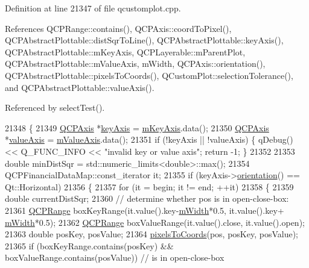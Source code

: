 Definition at line 21347 of file qcustomplot.\+cpp.



References Q\+C\+P\+Range\+::contains(), Q\+C\+P\+Axis\+::coord\+To\+Pixel(), Q\+C\+P\+Abstract\+Plottable\+::dist\+Sqr\+To\+Line(), Q\+C\+P\+Abstract\+Plottable\+::key\+Axis(), Q\+C\+P\+Abstract\+Plottable\+::m\+Key\+Axis, Q\+C\+P\+Layerable\+::m\+Parent\+Plot, Q\+C\+P\+Abstract\+Plottable\+::m\+Value\+Axis, m\+Width, Q\+C\+P\+Axis\+::orientation(), Q\+C\+P\+Abstract\+Plottable\+::pixels\+To\+Coords(), Q\+Custom\+Plot\+::selection\+Tolerance(), and Q\+C\+P\+Abstract\+Plottable\+::value\+Axis().



Referenced by select\+Test().


\begin{DoxyCode}
21348 \{
21349   \hyperlink{class_q_c_p_axis}{QCPAxis} *\hyperlink{class_q_c_p_abstract_plottable_a72c7a09c22963f2c943f07112b311103}{keyAxis} = \hyperlink{class_q_c_p_abstract_plottable_a426f42e254d0f8ce5436a868c61a6827}{mKeyAxis}.data();
21350   \hyperlink{class_q_c_p_axis}{QCPAxis} *\hyperlink{class_q_c_p_abstract_plottable_a3106f9d34d330a6097a8ec5905e5b519}{valueAxis} = \hyperlink{class_q_c_p_abstract_plottable_a2901452ca4aea911a1827717934a4bda}{mValueAxis}.data();
21351   \textcolor{keywordflow}{if} (!keyAxis || !valueAxis) \{ qDebug() << Q\_FUNC\_INFO << \textcolor{stringliteral}{"invalid key or value axis"}; \textcolor{keywordflow}{return} -1; \}
21352 
21353   \textcolor{keywordtype}{double} minDistSqr = std::numeric\_limits<double>::max();
21354   QCPFinancialDataMap::const\_iterator it;
21355   \textcolor{keywordflow}{if} (keyAxis->\hyperlink{class_q_c_p_axis_a57483f2f60145ddc9e63f3af53959265}{orientation}() == Qt::Horizontal)
21356   \{
21357     \textcolor{keywordflow}{for} (it = begin; it != end; ++it)
21358     \{
21359       \textcolor{keywordtype}{double} currentDistSqr;
21360       \textcolor{comment}{// determine whether pos is in open-close-box:}
21361       \hyperlink{class_q_c_p_range}{QCPRange} boxKeyRange(it.value().key-\hyperlink{class_q_c_p_financial_af630e5eb8485146b9c777e63fd1cf993}{mWidth}*0.5, it.value().key+
      \hyperlink{class_q_c_p_financial_af630e5eb8485146b9c777e63fd1cf993}{mWidth}*0.5);
21362       \hyperlink{class_q_c_p_range}{QCPRange} boxValueRange(it.value().close, it.value().open);
21363       \textcolor{keywordtype}{double} posKey, posValue;
21364       \hyperlink{class_q_c_p_abstract_plottable_a10408828446e9e0681c46d65120f382e}{pixelsToCoords}(pos, posKey, posValue);
21365       \textcolor{keywordflow}{if} (boxKeyRange.contains(posKey) && boxValueRange.contains(posValue)) \textcolor{comment}{// is in open-close-box}

\end{DoxyCode}
